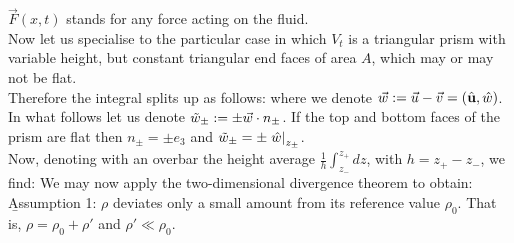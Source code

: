 \documentclass[10pt]{article}
\begin{document}
$\vec{F}(x,t)$ stands for any force acting on the fluid.\\
\linebreak
Now let us specialise to the particular case in which $V_{t}$ is a triangular prism with variable height, but constant triangular end faces of area $A$, which may or may not be flat.\\
\linebreak
Therefore the integral splits up as follows:
where we denote $\vec{w}: = \vec{u} - \vec{v} = (\hat{\textbf{u}},\hat{w})$. In what follows let us denote $\tilde{w}_{\pm} : = \pm\vec{w}\cdot n_{\pm}$. If the top and bottom faces of the prism are flat then $n_{\pm} = \pm e_{3}$ and $\tilde{w}_{\pm} = \pm\left.\hat{w}\right|_{z_{\pm}}$.\\
\linebreak
Now, denoting with an overbar the height average $\frac{1}{h}\int_{z_{-}}^{z_{+}}dz$, with $h = z_{+} - z_{-}$, we find:
We may now apply the two-dimensional divergence theorem to obtain:
\b{Assumption 1}: $\rho$ deviates only a small amount from its reference value $\rho_{0}$. That is, $\rho = \rho_{0} + \rho'$ and $\rho' \ll \rho_{0}$.\\
\end{document}
